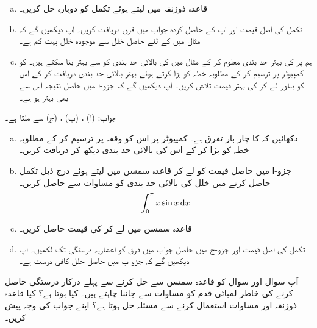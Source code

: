 \begin{enumerate}[a.]
\item
قاعدہ ذوزنقہ میں  لیتے ہوئے تکمل کو دوبارہ حل کریں۔
\item
تکمل کی اصل قیمت  اور آپ کے حاصل کردہ جواب میں فرق دریافت کریں۔ آپ دیکھیں گے کہ  مثال  میں کے لئے حاصل خلل  سے موجودہ خلل بہت کم ہے۔
\item
ہم   پر کی بہتر حد بندی معلوم کر کے  مثال  میں  کی بالائی حد بندی کو  سے بہتر بنا سکتے ہیں۔  کو کمپیوٹر پر ترسیم کر کے مطلوبہ خطہ کو بڑا کرتے ہوئے بہتر بالائی حد بندی دریافت کر کے اس کو بطور  لے کر کی بہتر قیمت تلاش کریں۔ آپ دیکھیں گے کہ جزو-ا میں حاصل نتیجہ اس سے بھی بہتر ہو ہے۔
\end{enumerate}
جواب:\quad
(ا) ، (ب) ، (ج)  سے  ملتا ہے۔
\begin{enumerate}[a.]
\item
دکھائیں کہ  کا چار بار تفرق  ہے۔ کمپیوٹر پر اس کو وقفہ  پر ترسیم کر کے مطلوبہ خطہ کو بڑا کر کے اس کی بالائی حد بندی دیکھ کر دریافت کریں۔
\item
جزو-ا میں حاصل قیمت کو  لے کر قاعدہ سمسن میں  لیتے ہوئے  درج ذیل تکمل حاصل کرنے میں خلل کی بالائی حد بندی  کو  مساوات  سے حاصل کریں۔
\begin{align*}
\int_0^{\pi}x\sin x\dif x
\end{align*}
\item
قاعدہ سمسن میں  لے کر  کی قیمت حاصل کریں۔
\item
تکمل کی اصل قیمت  اور جزو-ج میں حاصل جواب میں فرق کو  اعشاریہ درستگی تک لکھیں۔ آپ دیکھیں گے کہ جزو-ب میں حاصل خلل کافی درست ہے۔
\end{enumerate}
آپ سوال  اور سوال  کو قاعدہ سمسن سے حل کرنے سے پہلے درکار درستگی حاصل کرنے کی خاطر لمبائی قدم  کو مساوات  سے جاننا چاہتے ہیں۔ کیا ہوتا ہے؟ کیا قاعدہ ذوزنقہ اور مساوات  استعمال کرنے سے مسئلہ حل ہوتا ہے؟ اپنے جواب کی وجہ پیش کریں۔  

